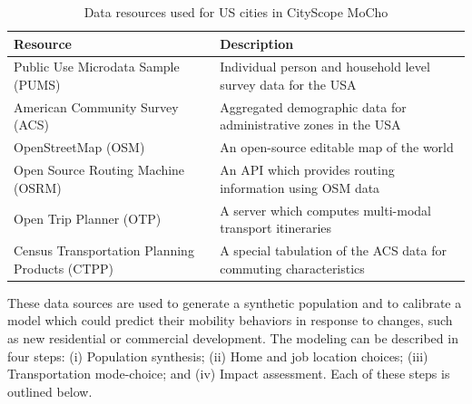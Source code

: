 {{        \begin{table}[!tb]
            \centering
            \begin{adjustbox}{width=\textwidth}
                \begin{tabular}{ll}
                    \hline
                    \textbf{Resource}                              & \textbf{Description}                                                               \\
                    \hline
                    Public Use Microdata Sample (PUMS)             & Individual person and household level survey data for the USA                      \\
                    American Community Survey (ACS)                & Aggregated demographic data for administrative zones in the USA                    \\
                    OpenStreetMap (OSM)                            & An open-source editable map of the world \cite{haklay2008openstreetmap}            \\
                    Open Source Routing Machine (OSRM)             & An API which provides routing information using OSM data \cite{huber2016calculate} \\
                    Open Trip Planner (OTP)                        & A server which computes multi-modal transport itineraries \cite{OTP}               \\
                    Census Transportation Planning Products (CTPP) & A special tabulation of the ACS data for commuting characteristics                 \\
                    \hline
                \end{tabular}
            \end{adjustbox}
            \caption{Data resources used for US cities in CityScope MoCho}
            \label{tab:mocho-dataSources}
        \end{table}

        These data sources are used to generate a synthetic population and to calibrate a model which could predict their mobility behaviors in response to changes, such as new residential or commercial development. The modeling can be described in four steps: (i) Population synthesis; (ii) Home and job location choices; (iii) Transportation mode-choice; and (iv) Impact assessment. Each of these steps is outlined below.
    }

}
